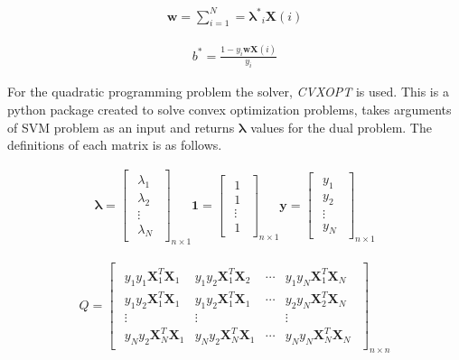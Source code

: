 \documentclass[11pt]{article}
\begin{document}
\begin{align*}
    \bm{w} = \sum_{i = 1}^ N = \bm{\lambda ^ *}_i \bm{X}(i)
\end{align*}

\begin{align*}
    b^* = \frac{1-y_i \bm{w}\bm{X}(i)}{y_i}
\end{align*}

For the quadratic programming problem the solver, \emph{CVXOPT} is used. This is a python package created to solve convex optimization problems, takes arguments of SVM problem as an input and returns $\bm{\lambda}$ values for the dual problem. The definitions of each matrix is as follows.

\begin{align*}
    \bm{\lambda} = 
    \begin{bmatrix}
        \begin{array}{c}
            \lambda_1 \\
            \lambda_2 \\
            \vdots \\
            \lambda_N
        \end{array}   
    \end{bmatrix}_{n\times 1}
    \bm{1} = 
    \begin{bmatrix}
        \begin{array}{c}
            1 \\
            1 \\
            \vdots \\
            1
        \end{array}   
    \end{bmatrix}_{n\times 1}
    \bm{y} = 
    \begin{bmatrix}
        \begin{array}{c}
            y_1 \\
            y_2 \\
            \vdots \\
            y_N
        \end{array}   
    \end{bmatrix}_{n\times 1}
\end{align*}


\begin{align*}
    Q = 
    \begin{bmatrix}
        \begin{array}{cccc}
            y_1y_1\bm{X}_1^T\bm{X}_1 & y_1y_2\bm{X}_1^T\bm{X}_2 & \cdots  &y_1y_N\bm{X}_1^T\bm{X}_N \\
            y_1y_2\bm{X}_1^T\bm{X}_1 & y_1y_2\bm{X}_1^T\bm{X}_1 & \cdots & y_2y_N\bm{X}_2^T\bm{X}_N \\
            \vdots & \vdots & & \vdots \\
            y_Ny_2\bm{X}_N^T\bm{X}_1 & y_Ny_2\bm{X}_N^T\bm{X}_1 & \cdots & y_Ny_N\bm{X}_N^T\bm{X}_N
        \end{array}   
    \end{bmatrix}_{n\times n}
\end{align*}
\end{document}
